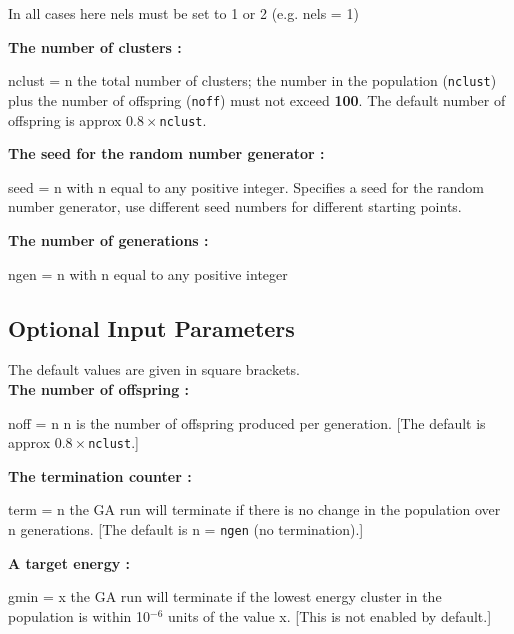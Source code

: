 \documentclass[12pt,a4paper]{article}
\newenvironment{entry}[1]
{\begin{list}{}{\renewcommand{\makelabel}[1]{~~\texttt{##1 :}\hfil}
      \setlength{\labelwidth}{90pt}
      \setlength{\leftmargin}{\labelwidth+\labelsep}}}
{\end{list}}
\begin{document}
\noindent In all cases here nels must be set to 1 or 2 (e.g. nels = 1)

\noindent \textbf{The number of clusters :}
\begin{entry}{d}
\item[nclust = n] the total number of clusters; the number in the population (\texttt{nclust}) plus the number of offspring (\texttt{noff}) must not exceed \textbf{100}. The default number of offspring is approx $0.8\times$\texttt{nclust}.
\end{entry}

\noindent \textbf{The seed for the random number generator :}
\begin{entry}{d}
\item[seed = n] with n equal to any positive integer. Specifies a seed for the random number generator, use different seed numbers for different starting points.
\end{entry}

\noindent \textbf{The number of generations :}
\begin{entry}{e}
\item[ngen = n] with n equal to any positive integer 
\end{entry}

\subsection{Optional Input Parameters}

The default values are given in square brackets. \\

\noindent \textbf{The number of offspring :}
\begin{entry}{a}
\item[noff = n] n is the number of offspring produced per generation. [The default is approx $0.8\times$\texttt{nclust}.]
\end{entry}

\noindent \textbf{The termination counter :}
\begin{entry}{a}
\item[term = n] the GA run will terminate if there is no change in the population over n generations. [The default is n = \texttt{ngen} (no termination).]
\end{entry} 

\noindent \textbf{A target energy :}
\begin{entry}{a}
\item[gmin = x] the GA run will terminate if the lowest energy cluster in the population is within 10$^{-6}$ units of the value x. [This is not enabled by default.]
\end{entry}
\end{document}
